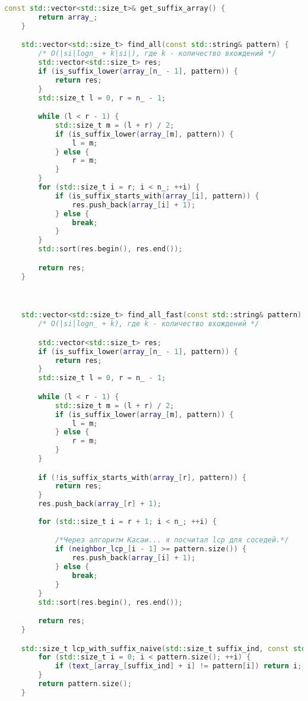 \begin{lstlisting}[language=C++]
    const std::vector<std::size_t>& get_suffix_array() {
        return array_;
    }

    std::vector<std::size_t> find_all(const std::string& pattern) {
        /* O(|si|logn_ + k|si|), где k - количество вхождений */
        std::vector<std::size_t> res;
        if (is_suffix_lower(array_[n_ - 1], pattern)) {
            return res;
        }
        std::size_t l = 0, r = n_ - 1;

        while (l < r - 1) {
            std::size_t m = (l + r) / 2;
            if (is_suffix_lower(array_[m], pattern)) {
                l = m;
            } else {
                r = m;
            }
        }
        for (std::size_t i = r; i < n_; ++i) {
            if (is_suffix_starts_with(array_[i], pattern)) {
                res.push_back(array_[i] + 1);
            } else {
                break;
            }
        }
        std::sort(res.begin(), res.end());

        return res;
    }



    std::vector<std::size_t> find_all_fast(const std::string& pattern) {
        /* O(|si|logn_ + k), где k - количество вхождений */

        std::vector<std::size_t> res;
        if (is_suffix_lower(array_[n_ - 1], pattern)) {
            return res;
        }
        std::size_t l = 0, r = n_ - 1;

        while (l < r - 1) {
            std::size_t m = (l + r) / 2;
            if (is_suffix_lower(array_[m], pattern)) {
                l = m;
            } else {
                r = m;
            }
        }

        if (!is_suffix_starts_with(array_[r], pattern)) {
            return res;
        }
        res.push_back(array_[r] + 1);
        
        for (std::size_t i = r + 1; i < n_; ++i) {

            /*Через алгоритм Касаи... я посчитал lcp для соседей.*/
            if (neighbor_lcp_[i - 1] >= pattern.size()) {
                res.push_back(array_[i] + 1);
            } else {
                break;
            }
        }
        std::sort(res.begin(), res.end());

        return res;
    }

    std::size_t lcp_with_suffix_naive(std::size_t suffix_ind, const std::string& pattern) {
        for (std::size_t i = 0; i < pattern.size(); ++i) {
            if (text_[array_[suffix_ind] + i] != pattern[i]) return i;
        }
        return pattern.size();
    }


\end{lstlisting}
